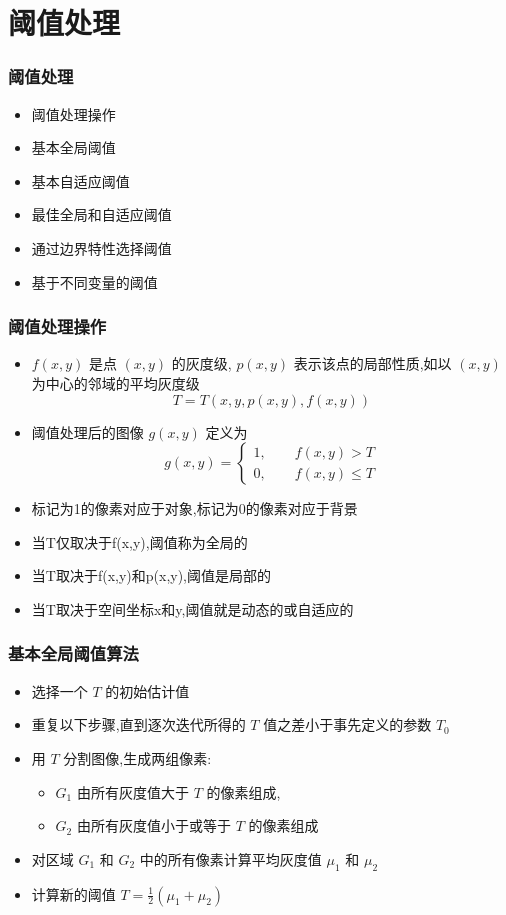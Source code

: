 \documentclass{beamer}
\begin{document}
\section{阈值处理}
\label{sec-4}
\begin{frame}
\frametitle{阈值处理}
\label{sec-4-1}

\begin{itemize}
\item 阈值处理操作
\item 基本全局阈值
\item 基本自适应阈值
\item 最佳全局和自适应阈值
\item 通过边界特性选择阈值
\item 基于不同变量的阈值
\end{itemize}
\end{frame}
\begin{frame}
\frametitle{阈值处理操作}
\label{sec-4-2}

\begin{itemize}
\item $f(x,y)$ 是点 $(x,y)$ 的灰度级, $p(x,y)$ 表示该点的局部性质,如以 $(x,y)$ 为中心的邻域的平均灰度级
     \[ T= T(x,y,p(x,y),f(x,y)) \]
\item 阈值处理后的图像 $g(x,y)$ 定义为
     \[ g(x,y)=\begin{cases}1, \qquad f(x,y)>T \\  0, \qquad f(x,y)\leq T \end{cases} \]
\item 标记为1的像素对应于对象,标记为0的像素对应于背景
\item 当T仅取决于f(x,y),阈值称为全局的
\item 当T取决于f(x,y)和p(x,y),阈值是局部的
\item 当T取决于空间坐标x和y,阈值就是动态的或自适应的
\end{itemize}
\end{frame}
\begin{frame}
\frametitle{基本全局阈值算法}
\label{sec-4-3}

\begin{itemize}
\item 选择一个 $T$ 的初始估计值
\item 重复以下步骤,直到逐次迭代所得的 $T$ 值之差小于事先定义的参数 $T_0$
\item 用 $T$ 分割图像,生成两组像素:
\begin{itemize}
\item $G_1$ 由所有灰度值大于 $T$ 的像素组成,
\item $G_2$ 由所有灰度值小于或等于 $T$ 的像素组成
\end{itemize}
\item 对区域 $G_1$ 和 $G_2$ 中的所有像素计算平均灰度值 $μ_1$ 和 $μ_2$
\item 计算新的阈值 $T=\frac{1}{2}(\mu_1+\mu_2)$
\end{itemize}
\end{frame}
\end{document}
